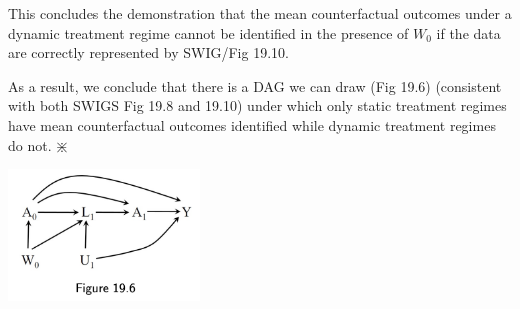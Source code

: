\documentclass[11pt]{article}
\begin{document}
This concludes the demonstration that the mean counterfactual outcomes under a dynamic treatment regime 
cannot be identified in the presence of $W_0$ if the data are correctly represented by SWIG/Fig 19.10.

As a result, we conclude that there is a DAG we can draw (Fig 19.6) (consistent
with both SWIGS Fig 19.8 and 19.10) under which only static treatment regimes
have mean counterfactual outcomes identified while dynamic treatment regimes do
not. \hfill $\divideontimes$

\begin{center}
\includegraphics[width=2in]{fig196.png}
\end{center}
\end{document}
